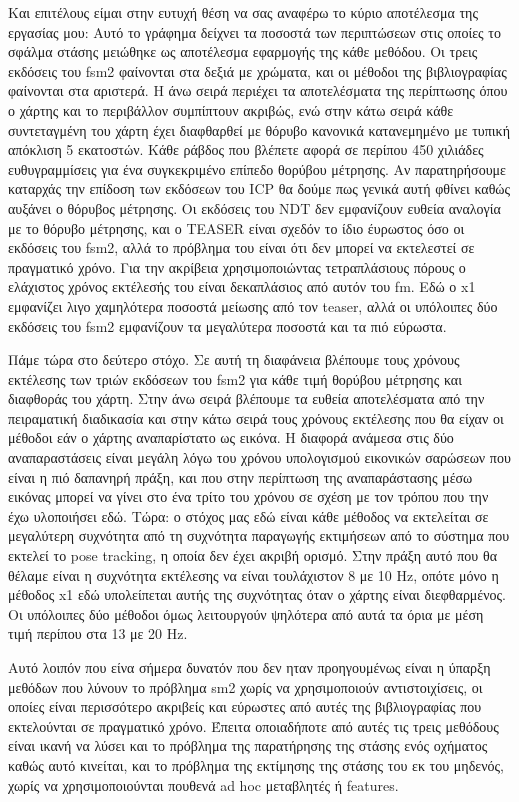 \documentclass[a4paper,10pt]{article}
\begin{document}
Και επιτέλους είμαι στην ευτυχή θέση να σας αναφέρω το κύριο αποτέλεσμα της
εργασίας μου: Αυτό το γράφημα δείχνει τα ποσοστά των περιπτώσεων στις οποίες το
σφάλμα στάσης μειώθηκε ως αποτέλεσμα εφαρμογής της κάθε μεθόδου.  Οι τρεις
εκδόσεις του fsm2 φαίνονται στα δεξιά με χρώματα, και οι μέθοδοι της
βιβλιογραφίας φαίνονται στα αριστερά. Η άνω σειρά περιέχει τα αποτελέσματα της
περίπτωσης όπου ο χάρτης και το περιβάλλον συμπίπτουν ακριβώς, ενώ στην κάτω
σειρά κάθε συντεταγμένη του χάρτη έχει διαφθαρθεί με θόρυβο κανονικά
κατανεμημένο με τυπική απόκλιση 5 εκατοστών. Κάθε ράβδος που βλέπετε αφορά σε
περίπου 450 χιλιάδες ευθυγραμμίσεις για ένα συγκεκριμένο επίπεδο θορύβου
μέτρησης. Αν παρατηρήσουμε καταρχάς την επίδοση των εκδόσεων του ICP θα δούμε
πως γενικά αυτή φθίνει καθώς αυξάνει ο θόρυβος μέτρησης. Οι εκδόσεις του NDT
δεν εμφανίζουν ευθεία αναλογία με το θόρυβο μέτρησης, και ο TEASER είναι σχεδόν
το ίδιο έυρωστος όσο οι εκδόσεις του fsm2, αλλά το πρόβλημα του είναι ότι δεν
μπορεί να εκτελεστεί σε πραγματικό χρόνο. Για την ακρίβεια χρησιμοποιώντας
τετραπλάσιους πόρους ο ελάχιστος χρόνος εκτέλεσής του είναι δεκαπλάσιος από
αυτόν του fm. Εδώ ο x1 εμφανίζει λιγο χαμηλότερα ποσοστά μείωσης από τον
teaser, αλλά οι υπόλοιπες δύο εκδόσεις του fsm2 εμφανίζουν τα μεγαλύτερα
ποσοστά και τα πιό εύρωστα.

Πάμε τώρα στο δεύτερο στόχο. Σε αυτή τη διαφάνεια βλέπουμε τους χρόνους
εκτέλεσης των τριών εκδόσεων του fsm2 για κάθε τιμή θορύβου μέτρησης και
διαφθοράς του χάρτη. Στην άνω σειρά βλέπουμε τα ευθεία αποτελέσματα από την
πειραματική διαδικασία και στην κάτω σειρά τους χρόνους εκτέλεσης που θα είχαν
οι μέθοδοι εάν ο χάρτης αναπαρίστατο ως εικόνα. Η διαφορά ανάμεσα στις δύο
αναπαραστάσεις είναι μεγάλη λόγω του χρόνου υπολογισμού εικονικών σαρώσεων που
είναι η πιό δαπανηρή πράξη, και που στην περίπτωση της αναπαράστασης μέσω
εικόνας μπορεί να γίνει στο ένα τρίτο του χρόνου σε σχέση με τον τρόπου που την
έχω υλοποιήσει εδώ. Τώρα: ο στόχος μας εδώ είναι κάθε μέθοδος να εκτελείται σε
μεγαλύτερη συχνότητα από τη συχνότητα παραγωγής εκτιμήσεων από το σύστημα που
εκτελεί το pose tracking, η οποία δεν έχει ακριβή ορισμό.  Στην πράξη αυτό που
θα θέλαμε είναι η συχνότητα εκτέλεσης να είναι τουλάχιστον 8 με 10 Hz, οπότε
μόνο η μέθοδος x1 εδώ υπολείπεται αυτής της συχνότητας όταν ο χάρτης είναι
διεφθαρμένος. Οι υπόλοιπες δύο μέθοδοι όμως λειτουργούν ψηλότερα από αυτά τα
όρια με μέση τιμή περίπου στα 13 με 20 Hz.

Αυτό λοιπόν που είνα σήμερα δυνατόν που δεν ηταν προηγουμένως είναι η ύπαρξη
μεθόδων που λύνουν το πρόβλημα sm2 χωρίς να χρησιμοποιούν αντιστοιχίσεις,
οι οποίες είναι περισσότερο ακριβείς και εύρωστες από αυτές της βιβλιογραφίας
που εκτελούνται σε πραγματικό χρόνο. Έπειτα οποιαδήποτε από αυτές τις τρεις
μεθόδους είναι ικανή να λύσει και το πρόβλημα της παρατήρησης της στάσης ενός
οχήματος καθώς αυτό κινείται, και το πρόβλημα της εκτίμησης της στάσης του εκ
του μηδενός, χωρίς να χρησιμοποιούνται πουθενά ad hoc μεταβλητές ή features.
\end{document}
